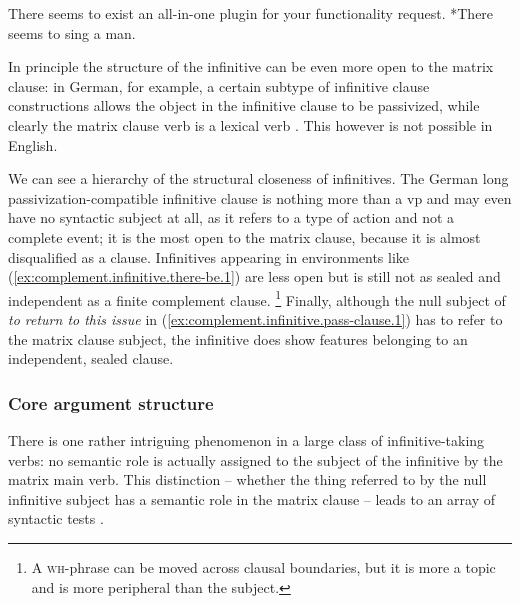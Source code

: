 \documentclass[UTF8, a4paper, oneside, scheme=plain, 12pt]{ctexbook}
\newcommand*{\citepage}[1]{p.~{#1}}
\newcommand{\form}[1]{\emph{#1}}
\newcommand{\category}[1]{\textsc{#1}}
\begin{document}
\begin{exe}
    \ex\label{ex:complement.infinitive.there-be.1} There seems to exist an all-in-one plugin for your functionality request.
    \ex\label{ex:complement.infinitive.there-be.2} *There seems to sing a man.
\end{exe}

In principle the structure of the infinitive can be even more open to the matrix clause: 
in German, for example, a certain subtype of infinitive clause constructions 
allows the object in the infinitive clause to be passivized, 
while clearly the matrix clause verb is a lexical verb \citep{wurmbrand2002syntactic}.
This however is not possible in English.

We can see a hierarchy of the structural closeness of infinitives.
The German long passivization-compatible infinitive clause is nothing more than a \acs{vp} 
and may even have no syntactic subject at all, 
as it refers to a type of action and not a complete event; 
it is the most open to the matrix clause, because it is almost disqualified as a clause.
Infinitives appearing in environments like (\ref{ex:complement.infinitive.there-be.1})
are less open but is still not as sealed and independent as a finite complement clause.%
\footnote{
    A \category{wh}-phrase can be moved across clausal boundaries, 
    but it is more a topic and is more peripheral than the subject.
}
Finally, although the null subject of \form{to return to this issue} 
in (\ref{ex:complement.infinitive.pass-clause.1})
has to refer to the matrix clause subject, 
the infinitive does show features belonging to an independent, sealed clause.

\subsubsection{Core argument structure}

There is one rather intriguing phenomenon in a large class of infinitive-taking verbs: 
no semantic role is actually assigned to the subject of the infinitive by the matrix main verb.
This distinction -- whether the thing referred to by the null infinitive subject 
has a semantic role in the matrix clause -- 
leads to an array of syntactic tests 
\citep[\citepage{1196}, {[8]}, except the matrix passivization and dummy subject tests]{cgel}.
\end{document}
